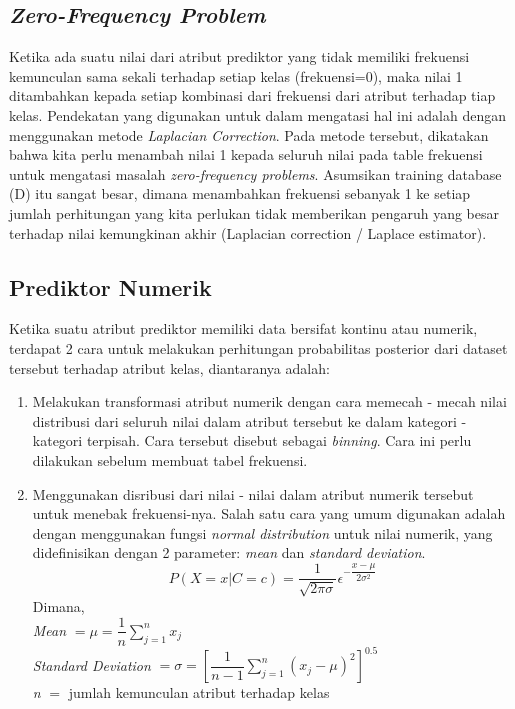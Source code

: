 \subsection{\textit{Zero-Frequency Problem}}
\label{subsec:Zero-Frequency Problem}
\cite{PeughMissing:2004} 
Ketika ada suatu nilai dari atribut prediktor yang tidak memiliki frekuensi kemunculan sama sekali terhadap setiap kelas (frekuensi=0), maka nilai 1 ditambahkan kepada setiap kombinasi dari frekuensi dari atribut terhadap tiap kelas. Pendekatan yang digunakan untuk dalam mengatasi hal ini adalah dengan menggunakan metode \textit{Laplacian Correction}. Pada metode tersebut, dikatakan bahwa kita perlu menambah nilai 1 kepada seluruh nilai pada table frekuensi untuk mengatasi masalah \textit{zero-frequency problems}. Asumsikan training database (D) itu sangat besar, dimana menambahkan frekuensi sebanyak 1 ke setiap jumlah perhitungan yang kita perlukan tidak memberikan pengaruh yang besar terhadap nilai kemungkinan akhir (Laplacian correction / Laplace estimator).

\subsection{Prediktor Numerik}
\label{subsec:Prediktor Numerik}
\cite{garg2013design} 
Ketika suatu atribut prediktor memiliki data bersifat kontinu atau numerik, terdapat 2 cara untuk melakukan perhitungan probabilitas posterior dari dataset tersebut terhadap atribut kelas, diantaranya adalah:
\begin{enumerate}
	\item Melakukan transformasi atribut numerik dengan cara memecah - mecah nilai distribusi dari seluruh nilai dalam atribut tersebut ke dalam kategori - kategori terpisah. Cara tersebut disebut sebagai \textit{binning}. Cara ini perlu dilakukan sebelum membuat tabel frekuensi.
	
	\item Menggunakan disribusi dari nilai - nilai dalam atribut numerik tersebut untuk menebak frekuensi-nya. Salah satu cara yang umum digunakan adalah dengan menggunakan fungsi \textit{normal distribution} untuk nilai numerik, yang didefinisikan dengan 2 parameter: \textit{mean} dan \textit{standard deviation}.
	\begin{equation}
	P(X=x|C=c) = \dfrac{1}{\sqrt{2\pi\sigma}}\epsilon^{-\dfrac{x-\mu}{2\sigma^2}}
	\end{equation}
	Dimana,\\
	\textit{Mean} $= \mu = \dfrac{1}{n}\sum^n_{j=1}x_j$\\
	\textit{Standard Deviation} $= \sigma = [\dfrac{1}{n-1}\sum^n_{j=1}(x_j-\mu)^2]^{0.5}$\\
	\textit{n} $=$ jumlah kemunculan atribut terhadap kelas
	
	
\end{enumerate}

